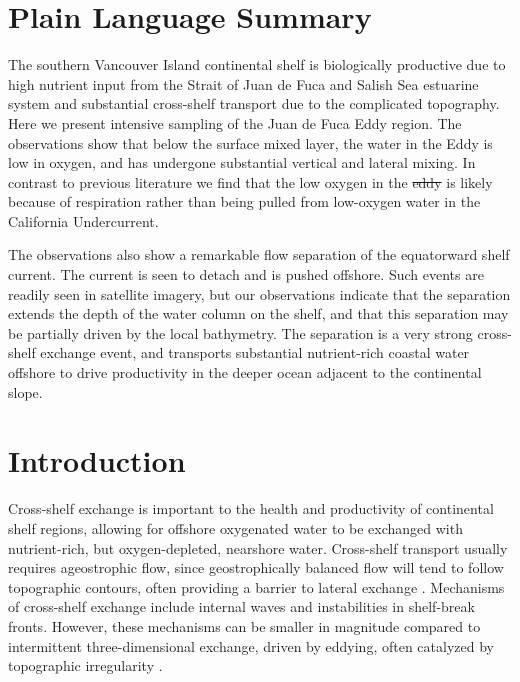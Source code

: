 \documentclass[draft]{agujournal2019}
\providecommand{\DIFadd}[1]{{\protect\color{blue}\uwave{#1}}} %
\providecommand{\DIFdel}[1]{{\protect\color{red}\sout{#1}}}                      %
\providecommand{\DIFaddbegin}{} %
\providecommand{\DIFaddend}{} %
\providecommand{\DIFdelbegin}{} %
\providecommand{\DIFdelend}{} %
\begin{document}
\section*{Plain Language Summary}

The southern Vancouver Island continental shelf is biologically productive due to high nutrient input from the Strait of Juan de Fuca and Salish Sea estuarine system and substantial cross-shelf transport due to the complicated topography.  Here we present intensive sampling of the Juan de Fuca Eddy region. The observations show that below the surface mixed layer, the water in the Eddy is low in oxygen, and has undergone substantial vertical and lateral mixing. In contrast to previous literature we find that the low oxygen in the \DIFdelbegin \DIFdel{eddy }\DIFdelend \DIFaddbegin \DIFadd{Eddy }\DIFaddend is likely because of respiration rather than being pulled from low-oxygen water in the California Undercurrent.

The observations also show a remarkable flow separation of the equatorward shelf current.  The current is seen to detach and is pushed offshore. Such events are readily seen in satellite imagery, but our observations indicate that the separation extends the depth of the water column on the shelf, and that this separation may be partially driven by the local bathymetry.  The separation is a very strong cross-shelf exchange event, and transports substantial nutrient-rich coastal water offshore to drive productivity in the deeper ocean adjacent to the continental slope.

%
%


\section{Introduction}

Cross-shelf exchange is important to the health and productivity of continental shelf regions, allowing for offshore oxygenated water to be exchanged with nutrient-rich, but oxygen-depleted, nearshore water.  Cross-shelf transport usually requires ageostrophic flow, since geostrophically balanced flow will tend to follow topographic contours, often providing a barrier to lateral exchange \cite{brink16}.  Mechanisms of cross-shelf exchange include internal waves and instabilities in shelf-break fronts.  However, these mechanisms can be smaller in magnitude compared to intermittent three-dimensional exchange, driven by eddying, often catalyzed by topographic irregularity \cite{barthetal00}.
\end{document}
